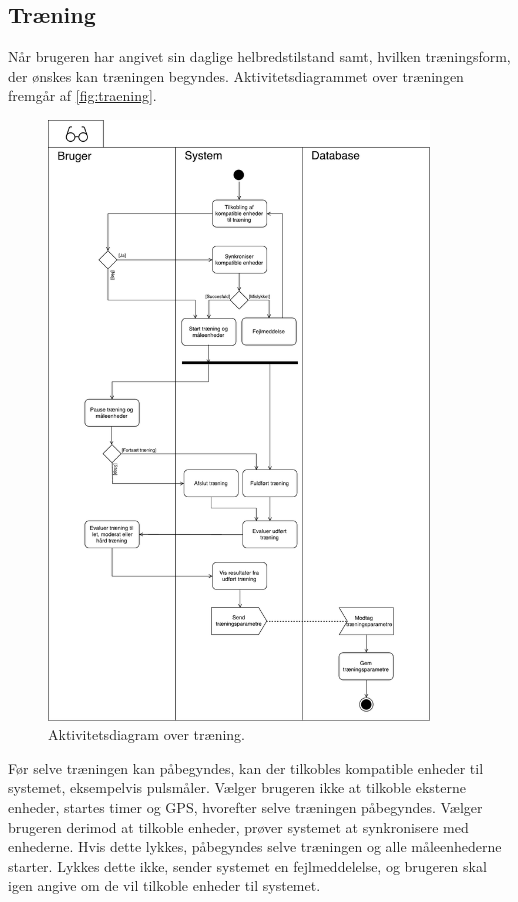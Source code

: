\subsection*{Træning} \label{sec:traening}
Når brugeren har angivet sin daglige helbredstilstand samt, hvilken træningsform, der ønskes kan træningen begyndes. Aktivitetsdiagrammet over træningen fremgår af \autoref{fig:traening}. 

\begin{figure} [H]
\centering
\includegraphics[width=0.9\textwidth]{figures/aktivitetsdiagram/Traening}
\caption{Aktivitetsdiagram over træning.}
\label{fig:traening}
\end{figure}

\noindent
Før selve træningen kan påbegyndes, kan der tilkobles kompatible enheder til systemet, eksempelvis pulsmåler. Vælger brugeren ikke at tilkoble eksterne enheder, startes timer og GPS, hvorefter selve træningen påbegyndes. Vælger brugeren derimod at tilkoble enheder, prøver systemet at synkronisere med enhederne.  Hvis dette lykkes, påbegyndes selve træningen og alle måleenhederne starter. Lykkes dette ikke, sender systemet en fejlmeddelelse, og brugeren skal igen angive om de vil tilkoble enheder til systemet.


